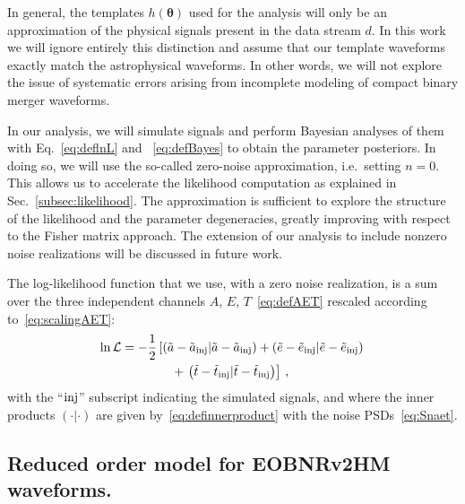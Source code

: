 \documentclass[aps,showpacs,twocolumn,prd,superscriptaddress,nofootinbib]{revtex4-1}
\newcommand\calL{{\mathcal{L}}}
\newcommand{\nn}{\nonumber}
\begin{document}
In general, the templates $h(\bm{\theta})$ used for the analysis will only be an approximation of the physical signals present in the data stream $d$.
In this work we will ignore entirely this distinction and assume that our template waveforms exactly match the astrophysical waveforms.
In other words, we will not explore the issue of systematic errors arising from incomplete modeling of compact binary merger waveforms.

In our analysis, we will simulate signals and perform Bayesian analyses of them with Eq.~\eqref{eq:deflnL} and ~\eqref{eq:defBayes} to obtain the parameter posteriors.
In doing so, we will use the so-called zero-noise approximation, i.e.~setting $n=0$.
This allows us to accelerate the likelihood computation as explained in Sec.~\ref{subsec:likelihood}.
The approximation is sufficient to explore the structure of the likelihood and the parameter degeneracies, greatly improving with respect to the Fisher matrix approach.
The extension of our analysis to include nonzero noise realizations will be discussed in future work.

The log-likelihood function that we use, with a zero noise realization, is a sum over the three independent channels $A$, $E$, $T$~\eqref{eq:defAET} rescaled according to~\eqref{eq:scalingAET}: 
\begin{align}\label{eq:deflnLaet}
	\ln\calL &= -\frac{1}{2} \left[ \left( \tilde{a} - \tilde{a}_{\rm inj} | \tilde{a} - \tilde{a}_{\rm inj}  \right) + \left( \tilde{e} - \tilde{e}_{\rm inj} | \tilde{e} - \tilde{e}_{\rm inj}  \right) \right. \nn\\
	& \qquad\qquad + \left. \left( \tilde{t} - \tilde{t}_{\rm inj} | \tilde{t} - \tilde{t}_{\rm inj} \right) \right] \,,
\end{align}
with the ``$\rm inj$'' subscript indicating the simulated signals, and where the inner products $(\cdot | \cdot)$ are given by~\eqref{eq:definnerproduct} with the noise PSDs~\eqref{eq:Snaet}.



\subsection{Reduced order model for EOBNRv2HM waveforms.}
\label{subsec:ROM}
\end{document}
